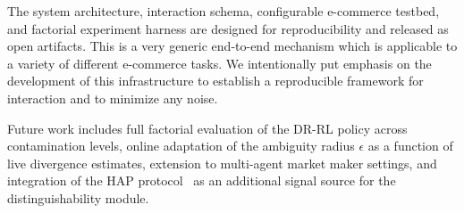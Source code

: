 \documentclass[sigconf]{acmart}
\begin{document}
The system architecture, interaction schema, configurable e-commerce testbed, and factorial experiment harness are designed for reproducibility and released as open artifacts. This is a very generic end-to-end mechanism which is applicable to a variety of different e-commerce tasks. We intentionally put emphasis on the development of this infrastructure to establish a reproducible framework for interaction and to minimize any noise.

Future work includes full factorial evaluation of the DR-RL policy across contamination levels, online adaptation of the ambiguity radius $\epsilon$ as a function of live divergence estimates, extension to multi-agent market maker settings, and integration of the HAP protocol~\cite{dhir_http_2025} as an additional signal source for the distinguishability module.



\end{document}
